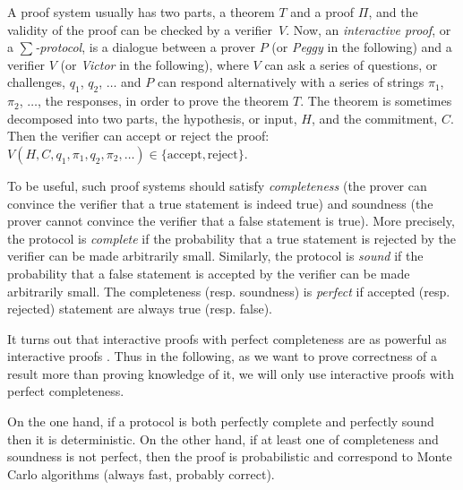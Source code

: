 \documentclass{article}
\begin{document}
A proof system usually has two parts, a theorem $T$ and a proof $\Pi$, and the
validity of the proof can be checked by a verifier~$V$.
Now, an {\em interactive proof}, or a
{\em $\sum$-protocol}, is a dialogue between a prover $P$ (or {\em Peggy} in
the following) and a verifier $V$ (or {\em Victor} in the following), where $V$
can ask a series of questions, or challenges, $q_1$, $q_2$, $\ldots$ and $P$ can
respond alternatively with a series of strings $\pi_1$, $\pi_2$, $\ldots$, the
responses,  in order to prove the theorem $T$. 
The theorem is sometimes decomposed into two parts, the hypothesis, or input,
$H$, and the commitment, $C$. Then the verifier can accept or reject the
proof: 
$V (H,C, q_1, \pi_1,q_2,\pi_2,\ldots)\in\{\text{accept}, \text{reject}\}$. 

To be useful, such proof systems should satisfy {\em completeness} (the prover
can convince the verifier that a true statement is indeed true) and soundness
(the prover cannot convince the verifier that a false statement is true). 
More precisely, the protocol is {\em complete} if the probability that a true
statement is rejected by the verifier can be made arbitrarily small.
Similarly, the protocol is {\em sound} if the probability that a false statement
is accepted by the verifier can be made arbitrarily small.
The completeness (resp. soundness) is {\em perfect} if accepted (resp. rejected)
statement are always true (resp. false). 

It turns out that interactive proofs with perfect completeness are as powerful
as interactive proofs \cite{Furer:1989:perfectcomp}.
Thus in the following, as we want to prove correctness of a result more than
proving knowledge of it, we will only use interactive proofs with perfect
completeness. 

On the one hand, if a protocol is both perfectly complete and perfectly sound
then it is deterministic. On the other hand, if at least one of completeness
and soundness is not perfect, then the proof is probabilistic and correspond to
Monte Carlo algorithms (always fast, probably correct).

 
 
 
 
 
 
\end{document}
